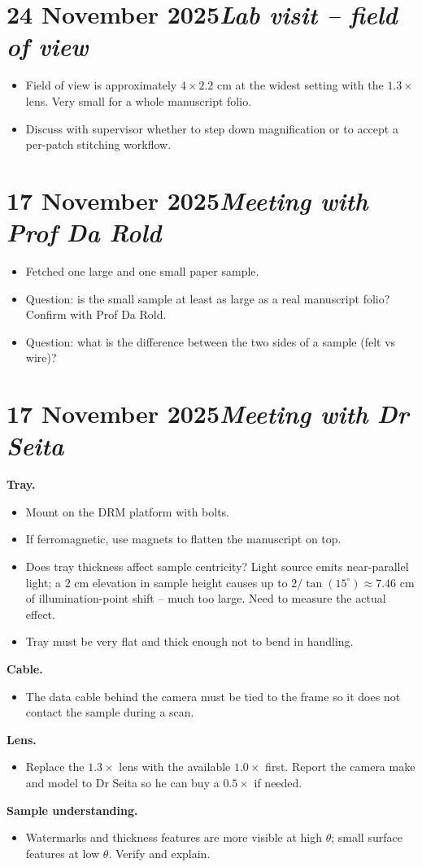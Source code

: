 \documentclass[11pt,a4paper]{article}
\newcommand{\logentry}[2]{\section*{#1\hfill\normalfont\normalsize\textit{#2}}}
\begin{document}
\logentry{24 November 2025}{Lab visit -- field of view}
\begin{itemize}
  \item Field of view is approximately $4 \times 2.2$ cm at the widest setting with the $1.3\times$ lens. Very small for a whole manuscript folio.
  \item Discuss with supervisor whether to step down magnification or to accept a per-patch stitching workflow.
\end{itemize}

\logentry{17 November 2025}{Meeting with Prof Da Rold}
\begin{itemize}
  \item Fetched one large and one small paper sample.
  \item Question: is the small sample at least as large as a real manuscript folio? Confirm with Prof Da Rold.
  \item Question: what is the difference between the two sides of a sample (felt vs wire)?
\end{itemize}

\logentry{17 November 2025}{Meeting with Dr Seita}
\textbf{Tray.}
\begin{itemize}
  \item Mount on the DRM platform with bolts.
  \item If ferromagnetic, use magnets to flatten the manuscript on top.
  \item Does tray thickness affect sample centricity? Light source emits near-parallel light; a $2$ cm elevation in sample height causes up to $2 / \tan(15^\circ) \approx 7.46$ cm of illumination-point shift -- much too large. Need to measure the actual effect.
  \item Tray must be very flat and thick enough not to bend in handling.
\end{itemize}
\textbf{Cable.}
\begin{itemize}
  \item The data cable behind the camera must be tied to the frame so it does not contact the sample during a scan.
\end{itemize}
\textbf{Lens.}
\begin{itemize}
  \item Replace the $1.3\times$ lens with the available $1.0\times$ first. Report the camera make and model to Dr Seita so he can buy a $0.5\times$ if needed.
\end{itemize}
\textbf{Sample understanding.}
\begin{itemize}
  \item Watermarks and thickness features are more visible at high $\theta$; small surface features at low $\theta$. Verify and explain.
\end{itemize}
\end{document}
